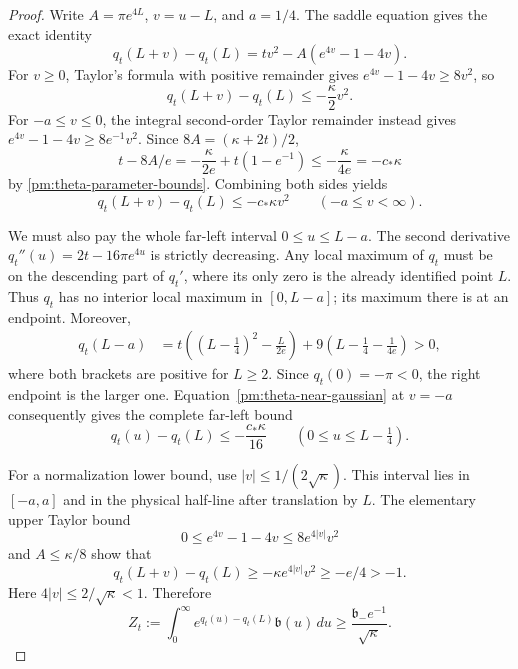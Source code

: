 \begin{proof}
Write \(A=\pi e^{4L}\), \(v=u-L\), and \(a=1/4\).
The saddle equation gives the exact identity
\begin{equation}
 q_t(L+v)-q_t(L)=tv^2-A(e^{4v}-1-4v).
 \label{pm:theta-exact-exponent}
\end{equation}
For \(v\ge0\), Taylor's formula with positive remainder gives
\(e^{4v}-1-4v\ge8v^2\), so
\begin{equation}
 q_t(L+v)-q_t(L)\le-\frac\kappa2v^2.
 \label{pm:theta-right-gaussian}
\end{equation}
For \(-a\le v\le0\), the integral second-order Taylor remainder
instead gives \(e^{4v}-1-4v\ge8e^{-1}v^2\).  Since
\(8A=(\kappa+2t)/2\),
\[
 t-8A/e=-\frac\kappa{2e}+t(1-e^{-1})
 \le-\frac\kappa{4e}=-c_*\kappa
\]
by \eqref{pm:theta-parameter-bounds}.  Combining both sides yields
\begin{equation}
 q_t(L+v)-q_t(L)\le-c_*\kappa v^2
            \qquad(-a\le v<\infty).
 \label{pm:theta-near-gaussian}
\end{equation}

We must also pay the whole far-left interval \(0\le u\le L-a\).
The second derivative \(q_t''(u)=2t-16\pi e^{4u}\) is strictly
decreasing.  Any local maximum of \(q_t\) must be on the descending
part of \(q_t'\), where its only zero is the already identified
point \(L\).  Thus \(q_t\) has no interior local maximum in
\([0,L-a]\); its maximum there is at an endpoint.  Moreover,
\begin{align*}
 q_t(L-a)
 &=t\left((L-\tfrac14)^2-\frac{L}{2e}\right)
       +9\left(L-\tfrac14-\frac1{4e}\right)>0,
\end{align*}
where both brackets are positive for \(L\ge2\).  Since
\(q_t(0)=-\pi<0\), the right endpoint is the larger one.
Equation~\eqref{pm:theta-near-gaussian} at \(v=-a\) consequently
gives the complete far-left bound
\begin{equation}
 q_t(u)-q_t(L)\le-\frac{c_*\kappa}{16}
                  \qquad(0\le u\le L-\tfrac14).
 \label{pm:theta-far-left}
\end{equation}

For a normalization lower bound, use
\(|v|\le1/(2\sqrt\kappa)\).  This interval lies in \([-a,a]\)
and in the physical half-line after translation by \(L\).
The elementary upper Taylor bound
\[
 0\le e^{4v}-1-4v\le8e^{4|v|}v^2
\]
and \(A\le\kappa/8\) show that
\[
 q_t(L+v)-q_t(L)\ge-\kappa e^{4|v|}v^2
             \ge-e/4>-1.
\]
Here \(4|v|\le2/\sqrt\kappa<1\).  Therefore
\begin{equation}
 Z_t:=\int_0^\infty e^{q_t(u)-q_t(L)}\mathfrak b(u)\,du
       \ge\frac{\mathfrak b_-e^{-1}}{\sqrt\kappa}.
 \label{pm:theta-normalization-lower}
\end{equation}


\end{proof}
